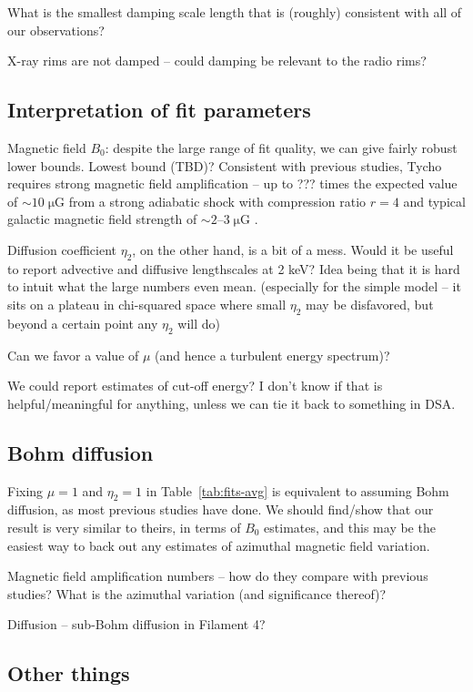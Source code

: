 \documentclass[iop, apj, numberedappendix, twocolappendix]{emulateapj}
\newcommand*{\mt}{\mathrm}
\newcommand*{\unit}[1]{\;\mt{#1}}  %
\newcommand*{\abt}{\mathord{\sim}} %
\begin{document}
What is the smallest damping scale length that is (roughly) consistent with all
of our observations?

X-ray rims are not damped -- could damping be relevant to the radio rims?

\subsection{Interpretation of fit parameters}

Magnetic field $B_0$: despite the large range of fit quality, we can give
fairly robust lower bounds.  Lowest bound (TBD)?  Consistent with previous
studies, Tycho requires strong magnetic field amplification -- up to ??? times
the expected value of $\abt 10 \unit{\mu G}$ from a strong adiabatic shock with
compression ratio $r=4$ and typical galactic magnetic field strength of $\abt
2$--$3 \unit{\mu G}$ \citep{lyne1989, han2006}.

Diffusion coefficient $\eta_2$, on the other hand, is a bit of a mess.
Would it be useful to report advective and diffusive lengthscales at 2 keV?
Idea being that it is hard to intuit what the large numbers even mean.
(especially for the simple model -- it sits on a plateau in chi-squared space
where small $\eta_2$ may be disfavored, but beyond a certain point any $\eta_2$
will do)

Can we favor a value of $\mu$ (and hence a turbulent energy spectrum)?

We could report estimates of cut-off energy?  I don't know if that is
helpful/meaningful for anything, unless we can tie it back to something in DSA.

\subsection{Bohm diffusion}

Fixing $\mu = 1$ and $\eta_2 = 1$ in Table~\ref{tab:fits-avg} is equivalent to
assuming Bohm diffusion, as most previous studies have done.
We should find/show that our result is very similar to theirs, in terms of
$B_0$ estimates, and this may be the easiest way to back out any estimates of
azimuthal magnetic field variation.

Magnetic field amplification numbers -- how do they compare with previous
studies?  What is the azimuthal variation (and significance thereof)?

Diffusion -- sub-Bohm diffusion in Filament 4?

\subsection{Other things}
\end{document}
